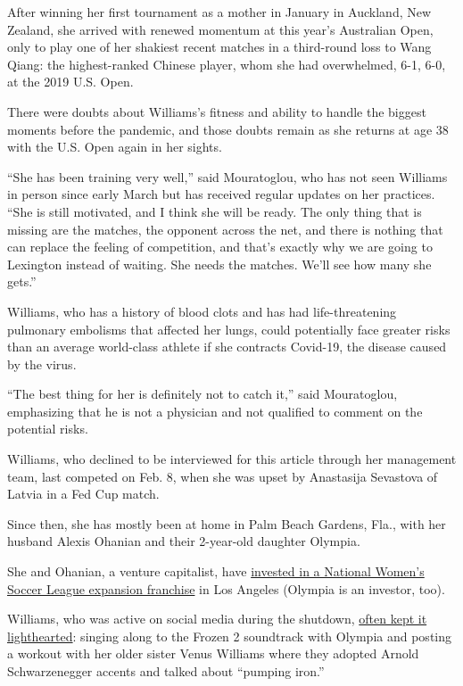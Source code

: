 After winning her first tournament as a mother in January in Auckland,
New Zealand, she arrived with renewed momentum at this year's Australian
Open, only to play one of her shakiest recent matches in a third-round
loss to Wang Qiang: the highest-ranked Chinese player, whom she had
overwhelmed, 6-1, 6-0, at the 2019 U.S. Open.

There were doubts about Williams's fitness and ability to handle the
biggest moments before the pandemic, and those doubts remain as she
returns at age 38 with the U.S. Open again in her sights.

``She has been training very well,'' said Mouratoglou, who has not seen
Williams in person since early March but has received regular updates on
her practices. ``She is still motivated, and I think she will be ready.
The only thing that is missing are the matches, the opponent across the
net, and there is nothing that can replace the feeling of competition,
and that's exactly why we are going to Lexington instead of waiting. She
needs the matches. We'll see how many she gets.''

Williams, who has a history of blood clots and has had life-threatening
pulmonary embolisms that affected her lungs, could potentially face
greater risks than an average world-class athlete if she contracts
Covid-19, the disease caused by the virus.

``The best thing for her is definitely not to catch it,'' said
Mouratoglou, emphasizing that he is not a physician and not qualified to
comment on the potential risks.

Williams, who declined to be interviewed for this article through her
management team, last competed on Feb. 8, when she was upset by
Anastasija Sevastova of Latvia in a Fed Cup match.

Since then, she has mostly been at home in Palm Beach Gardens, Fla.,
with her husband Alexis Ohanian and their 2-year-old daughter Olympia.

She and Ohanian, a venture capitalist, have
\href{https://www.nytimes.com/2020/07/21/sports/soccer/angel-city-fc-nwsl.html}{invested
in a National Women's Soccer League expansion franchise} in Los Angeles
(Olympia is an investor, too).

Williams, who was active on social media during the shutdown,
\href{https://www.instagram.com/p/CDkFg76HjNX/}{often kept it
lighthearted}: singing along to the Frozen 2 soundtrack with Olympia and
posting a workout with her older sister Venus Williams where they
adopted Arnold Schwarzenegger accents and talked about ``pumping iron.''

